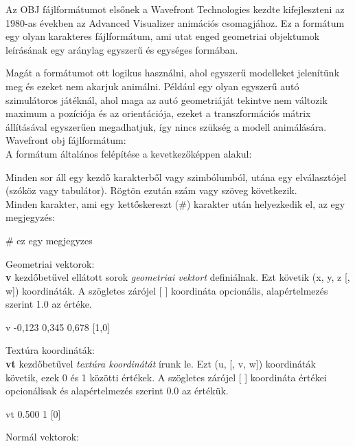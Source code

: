 
Az OBJ fájlformátumot elsőnek a Wavefront Technologies kezdte kifejleszteni az 1980-as években az Advanced Visualizer animációs csomagjához. Ez a formátum egy olyan karakteres fájlformátum, ami utat enged geometriai objektumok leírásának egy aránylag egyszerű és egységes formában.\cite{martinreddy}

Magát a formátumot ott logikus használni, ahol egyszerű modelleket jelenítünk meg és ezeket nem akarjuk animálni. Például egy olyan egyszerű autó szimulátoros játéknál, ahol maga az autó geometriáját tekintve nem változik maximum a pozíciója és az orientációja, ezeket a transzformációs mátrix állításával egyszerűen megadhatjuk, így nincs szükség a modell animálására.\\

\noindent Wavefront obj fájlformátum:\\

\noindent A formátum általános felépítése a kevetkezőképpen alakul:

Minden sor áll egy kezdő karakterből vagy szimbólumból, utána egy elválasztójel (szóköz vagy tabulátor). Rögtön ezután szám vagy szöveg következik.\\

\noindent Minden karakter, ami egy kettőskereszt (\#) karakter után helyezkedik el, az egy megjegyzés:

\bigskip
\begin{python}
# ez egy megjegyzes
\end{python}
\bigskip
Geometriai vektorok:\\

\noindent \textbf{v} kezdőbetűvel ellátott sorok \textsl{geometriai vektort} definiálnak. Ezt követik (x, y, z [, w]) koordináták. A szögletes zárójel [ ] koordináta opcionális, alapértelmezés szerint 1.0 az értéke.
\bigskip
\begin{python} 
v -0,123 0,345 0,678 [1,0]
\end{python}

\newpage
Textúra koordináták:\\

\noindent \textbf{vt} kezdőbetűvel \textsl{textúra koordinátát} írunk le. Ezt (u, [, v, w]) koordináták követik, ezek 0 és 1 közötti értékek. A szögletes zárójel [ ] koordináta értékei opcionálisak és alapértelmezés szerint 0.0 az értékük.
\bigskip
\begin{python} 
vt 0.500 1 [0]
\end{python}
\bigskip
Normál vektorok:\\

